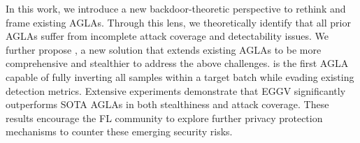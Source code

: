 
In this work, we introduce a new backdoor-theoretic perspective to rethink and frame existing AGLAs. Through this lens, we theoretically identify that all prior AGLAs suffer from incomplete attack coverage and detectability issues. We further propose \name, a new solution that extends existing AGLAs to be more comprehensive and stealthier to address the above challenges. \name is the first AGLA capable of fully inverting all samples within a target batch while evading existing detection metrics. Extensive experiments demonstrate that EGGV significantly outperforms SOTA AGLAs in both stealthiness and attack coverage. These results encourage the FL community to explore further privacy protection mechanisms to counter these emerging security risks.